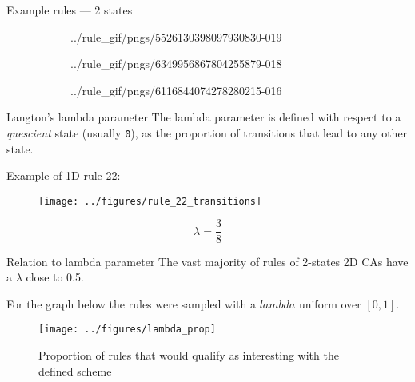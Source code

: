 \documentclass[xcolor=dvipsnames]{beamer}
\begin{document}
\begin{frame}{Example rules --- 2 states}
  \begin{figure}[htbp]
    \centering
    \begin{subfigure}{.32\linewidth}
      \centering
      {../rule_gif/pngs/5526130398097930830-}{0}{19}
    \end{subfigure}
    \begin{subfigure}{.32\linewidth}
      \centering
      {../rule_gif/pngs/6349956867804255879-}{0}{18}
    \end{subfigure}
    \begin{subfigure}{.32\linewidth}
      \centering
      {../rule_gif/pngs/6116844074278280215-}{0}{16}
    \end{subfigure}
  \end{figure}
\end{frame}

\begin{frame}{Langton's lambda parameter}
  The lambda parameter is defined with respect to a \emph{quescient} state
  (usually \texttt{0}), as the proportion of transitions that lead to any other
  state.
  \vfill


  Example of 1D rule 22:
  \begin{figure}[htbp]
    \centering
    \texttt{[image: ../figures/rule\_22\_transitions]}
  \end{figure}

  $$\boxed{\lambda = \frac{3}{8}}$$
\end{frame}


\begin{frame}{Relation to lambda parameter}
  The vast majority of rules of 2-states 2D CAs have a $\lambda$ close to 0.5.


  For the graph below the rules were sampled with a $lambda$ uniform over $[0,
  1]$.
  \begin{figure}[htbp]
    \centering
    \texttt{[image: ../figures/lambda\_prop]}
    \caption{Proportion of rules that would qualify as interesting with the
      defined scheme}
  \end{figure}

\end{frame}
\end{document}
